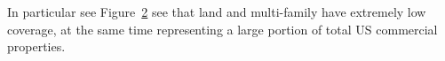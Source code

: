 \documentclass[
  12pt]{article}
\begin{document}
\begin{figure}


\caption{\label{fig-sunburst1}}

\end{figure}%

In particular see Figure~\ref{fig-sunburst2} see that land and
multi-family have extremely low coverage, at the same time representing
a large portion of total US commercial properties.

\begin{figure}


\caption{\label{fig-sunburst2}}

\end{figure}%
\end{document}
